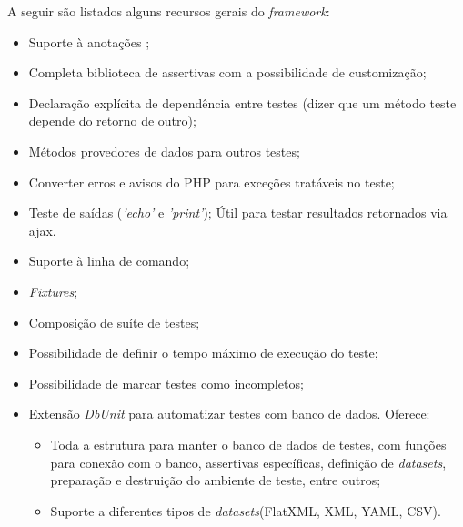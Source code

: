     A seguir são listados alguns recursos gerais do \textit{framework}:
    
    \begin{itemize}
      \item Suporte à anotações \footnotemark ;
		      
      \item Completa biblioteca de assertivas com a possibilidade de customização;
	
      \item Declaração explícita de dependência entre testes (dizer que um método teste depende do retorno de outro);
      
      \item Métodos provedores de dados para outros testes;
      
      \item Converter erros e avisos do PHP para exceções tratáveis no teste;
      
      \item Teste de saídas (\textit{'echo'} e \textit{'print'});
	\subitem Útil para testar resultados retornados via ajax.
	
      \item Suporte à linha de comando;
      
      \item \textit{Fixtures};
      
      \item Composição de suíte de testes;
      
      \item Possibilidade de definir o tempo máximo de execução do teste;
      
      \item Possibilidade de marcar testes como incompletos;
      
      \item Extensão \textit{DbUnit} para automatizar testes com banco de dados. Oferece:
	\begin{itemize}
	 \item Toda a estrutura para manter o banco de dados de testes, com funções para conexão
		com o banco, assertivas específicas, definição de \textit{datasets}, preparação
		e destruição do ambiente de teste, entre outros;
	 \item Suporte a diferentes tipos de \textit{datasets}(FlatXML, XML, YAML, CSV).
	\end{itemize}
      

\end{itemize}
